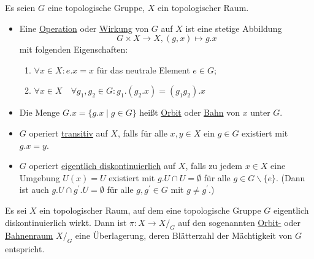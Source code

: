 \documentclass[a4paper,11pt,notitlepage]{report}
\theoremstyle{definition}
\begin{document}
Es seien $G$ eine topologische Gruppe, $X$ ein topologischer Raum.
\begin{definition}
	\begin{itemize}
		\item Eine \underline{Operation} oder \underline{Wirkung} von $G$ auf $X$ ist eine stetige Abbildung 
		$$G \times X \rightarrow X, (g,x) \mapsto g. x$$
		mit folgenden Eigenschaften:
		\begin{enumerate}
			\item $\forall x \in X \colon e. x = x$ für das neutrale Element $e \in G$;
			\item $\forall x \in X \quad \forall g_1, g_2 \in G \colon g_1.(g_2.x) = (g_1g_2).x$
		\end{enumerate}
		
		\item Die Menge $G.x = \{ g.x \mid g \in G\}$ heißt \underline{Orbit} oder \underline{Bahn} von $x$ unter $G$.
		
		\item $G$ operiert \underline{transitiv} auf $X$, falls für alle $x,y \in X$ ein $g \in G$ existiert mit $g.x = y$.
		
		\item $G$ operiert \underline{eigentlich diskontinuierlich} auf $X$, falls zu jedem $x \in X$ eine Umgebung $U(x) = U$ existiert mit $g.U \cap U = \emptyset$ für alle $g \in G \backslash \{e\}$.
		\newline
		(Dann ist auch $g.U \cap g^\prime.U = \emptyset$ für alle $g, g^\prime \in G$ mit $g \neq g^\prime$.)
	\end{itemize}
\end{definition}

\begin{theorem}
	Es sei $X$ ein topologischer Raum, auf dem eine topologische Gruppe $G$ eigentlich diskontinuierlich wirkt. Dann ist $\pi \colon X \rightarrow X/_G$ auf den sogenannten \underline{Orbit-} oder \underline{Bahnenraum} $X/_G$ eine Überlagerung, deren Blätterzahl der Mächtigkeit von $G$ entspricht.
\end{theorem}
\end{document}
